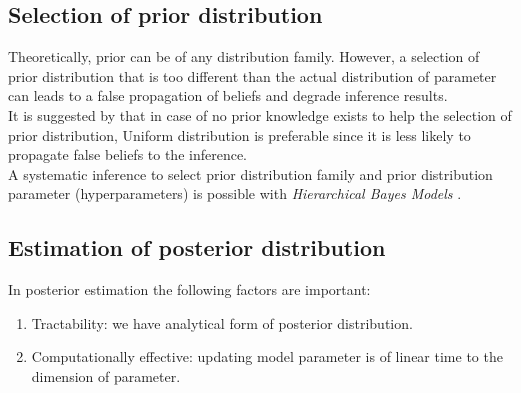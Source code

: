 \subsection{Selection of prior distribution}
Theoretically, prior can be of any distribution family. However, a selection of prior distribution
that is too different than the actual distribution of parameter can leads to a false propagation of
beliefs and degrade inference results.\\
It is suggested by \cite{polgreen2016data} that in case of no prior knowledge exists to help the
selection of prior distribution, Uniform distribution is preferable since it is less likely to
propagate false beliefs to the inference.\\
A systematic inference to select prior distribution family and prior distribution parameter
(hyperparameters) is possible with \textit{Hierarchical Bayes Models}
\cite{allenby2005hierarchical}.

\subsection{Estimation of posterior distribution}
In posterior estimation the following factors are important:
\begin{enumerate}
    \item Tractability: we have analytical form of posterior distribution.
    \item Computationally effective: updating model parameter is of linear time to the dimension of
          parameter.
\end{enumerate}

